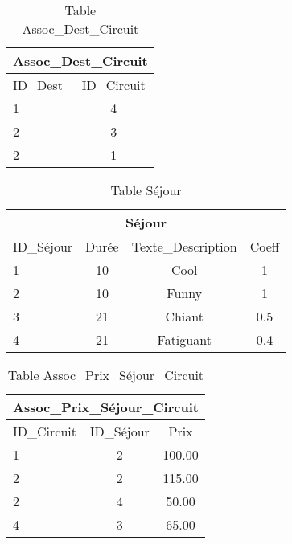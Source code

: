 \documentclass[10pt]{article}
\begin{document}

\begin{table}[h]
\begin{center}
\begin{tabular}{|l|c|}
\hline
\multicolumn{2}{|c|}{Assoc\_Dest\_Circuit}\\
\hline
ID\_Dest& ID\_Circuit \\
\hline
1 & 4\\
\hline
2 & 3\\
\hline
2 & 1\\
\hline
\end{tabular}
\end{center}
\caption{Table Assoc\_Dest\_Circuit}
\end{table}


\begin{table}[h]
\begin{center}
\begin{tabular}{|l|c|c|c|}
\hline
\multicolumn{4}{|c|}{Séjour}\\
\hline
ID\_Séjour& Durée & Texte\_Description& Coeff\\
\hline
1 & 10& Cool & 1\\
\hline
2 & 10& Funny& 1\\
\hline
3 & 21& Chiant& 0.5\\
\hline
4 & 21& Fatiguant& 0.4\\
\hline
\end{tabular}
\end{center}
\caption{Table Séjour}
\end{table}


\begin{table}[h]
\begin{center}
\begin{tabular}{|l|c|c|}
\hline
\multicolumn{3}{|c|}{Assoc\_Prix\_Séjour\_Circuit}\\
\hline
ID\_Circuit& ID\_Séjour & Prix\\
\hline
1 & 2& 100.00\\
\hline
2 & 2& 115.00\\
\hline
2 & 4& 50.00\\
\hline
4 & 3& 65.00\\
\hline
\end{tabular}
\end{center}
\caption{Table Assoc\_Prix\_Séjour\_Circuit}
\end{table}
\newpage
\end{document}
